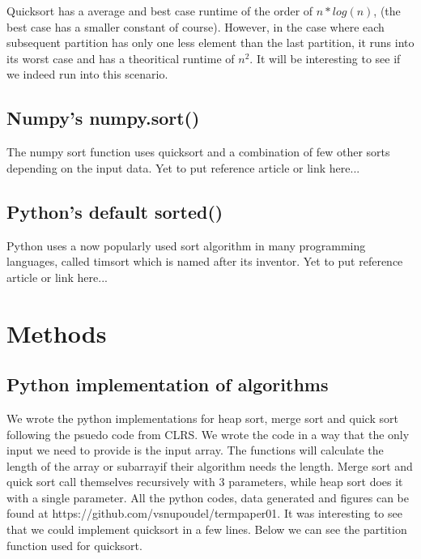 \documentclass[sigconf, nonacm, natbib, screen, balance=False]{acmart}
\begin{document}
 Quicksort has a average and best case runtime of the order of $n*log(n)$, (the best case has a smaller constant of course).
 However, in the case where each subsequent partition has only one less element than the last partition, it runs
into its worst case and has a theoritical runtime of $n^2$. It will be interesting to see if we indeed run into this scenario.

\subsection{Numpy's numpy.sort()}\label{sec:numpy sort}
The numpy sort function uses quicksort and a combination of few other sorts depending on the input data. Yet to 
put reference article or link here...

\subsection{Python's default sorted()}\label{sec:sorted sort}
Python uses a now popularly used sort algorithm in many programming languages, called timsort which is named after its
inventor. Yet to put reference article or link here...

\section{Methods}\label{sec:methods}

\subsection{Python implementation of algorithms}\label{sec:python implementation}

We wrote the python implementations for heap sort, merge sort and quick sort following the psuedo code from CLRS. We wrote
the code in a way that the only input we need to provide is the input array. The functions will calculate the length of the array 
or subarrayif their algorithm needs the length. Merge sort and quick sort call themselves recursively with 3 parameters, while heap
sort does it with a single parameter. All the python codes, data generated and figures can be found at https://github.com/vsnupoudel/termpaper01.
It was interesting to see that we could implement quicksort in a few lines. Below we can see the partition function used for quicksort.
\end{document}
